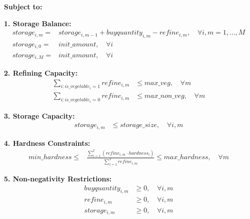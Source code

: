\documentclass{article}
\begin{document}
\textbf{Subject to:}

\textbf{1. Storage Balance:}
\begin{align*}
storage_{i,m} = & storage_{i,m-1} + buyquantity_{i,m} - refine_{i,m}, \quad \forall i, m = 1, \ldots, M \\
storage_{i,0} = & init\_amount, \quad \forall i \\
storage_{i,M} = & init\_amount, \quad \forall i
\end{align*}

\textbf{2. Refining Capacity:}
\begin{align*}
\sum_{i: is\_vegetable_{i}=1} refine_{i,m} & \leq max\_veg, \quad \forall m \\
\sum_{i: is\_vegetable_{i}=0} refine_{i,m} & \leq max\_non\_veg, \quad \forall m
\end{align*}

\textbf{3. Storage Capacity:}
\begin{align*}
storage_{i,m} & \leq storage\_size, \quad \forall i, m
\end{align*}

\textbf{4. Hardness Constraints:}
\begin{align*}
min\_hardness \leq & \frac{\sum_{i=1}^{I} (refine_{i,m} \cdot hardness_{i})}{\sum_{i=1}^{I} refine_{i,m}} \leq max\_hardness, \quad \forall m
\end{align*}

\textbf{5. Non-negativity Restrictions:}
\begin{align*}
buyquantity_{i,m} & \geq 0, \quad \forall i, m \\
refine_{i,m} & \geq 0, \quad \forall i, m \\
storage_{i,m} & \geq 0, \quad \forall i, m
\end{align*}
\end{document}
